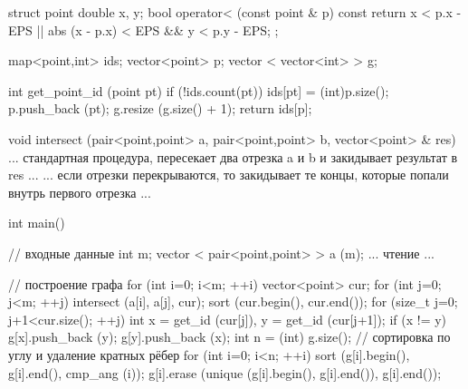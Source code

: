 struct point {
	double x, y;
	bool operator< (const point & p) const {
		return x < p.x - EPS || abs (x - p.x) < EPS && y < p.y - EPS;
	}
};

map<point,int> ids;
vector<point> p;
vector < vector<int> > g;

int get_point_id (point pt) {
	if (!ids.count(pt)) {
		ids[pt] = (int)p.size();
		p.push_back (pt);
		g.resize (g.size() + 1);
	}
	return ids[p];
}

void intersect (pair<point,point> a, pair<point,point> b, vector<point> & res) {
	... стандартная процедура, пересекает два отрезка a и b и закидывает результат в res ...
	... если отрезки перекрываются, то закидывает те концы, которые попали внутрь первого отрезка ...
}

int main() {
	// входные данные
	int m;
	vector < pair<point,point> > a (m);
	... чтение ...

	// построение графа
	for (int i=0; i<m; ++i) {
		vector<point> cur;
		for (int j=0; j<m; ++j)
			intersect (a[i], a[j], cur);
		sort (cur.begin(), cur.end());
		for (size_t j=0; j+1<cur.size(); ++j) {
			int x = get_id (cur[j]),  y = get_id (cur[j+1]);
			if (x != y) {
				g[x].push_back (y);
				g[y].push_back (x);
			}
		}
	}
	int n = (int) g.size();
	// сортировка по углу и удаление кратных рёбер
	for (int i=0; i<n; ++i) {
		sort (g[i].begin(), g[i].end(), cmp_ang (i));
		g[i].erase (unique (g[i].begin(), g[i].end()), g[i].end());
	}
}
\endcode